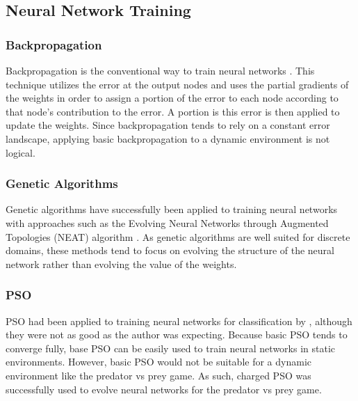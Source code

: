 \subsection{Neural Network Training}
\subsubsection{Backpropagation}
Backpropagation is the conventional way to train neural networks \cite{yann}. This technique utilizes the error at the output nodes and uses the partial gradients of the weights in order to assign a portion of the error to each node according to that node's contribution to the error. A portion is this error is then applied to update the weights. Since backpropagation tends to rely on a constant error landscape, applying basic backpropagation to a dynamic environment is not logical.

\subsubsection{Genetic Algorithms}
Genetic algorithms have successfully been applied to training neural networks\cite{koehn} with approaches such as the Evolving Neural Networks through Augmented Topologies (NEAT) algorithm \cite{neat}. As genetic algorithms are well suited for discrete domains, these methods tend to focus on evolving the structure of the neural network rather than evolving the value of the weights.


\subsubsection{PSO}
PSO had been applied to training neural networks for classification by \cite{Garro}, although they were not as good as the author was expecting. Because basic PSO tends to converge fully, base PSO can be easily used to train neural networks in static environments. However, basic PSO would not be suitable for a dynamic environment like the predator vs prey game. As such, charged PSO was successfully used to evolve neural networks for the predator vs prey game\cite{Langenhoven-2006}. 


